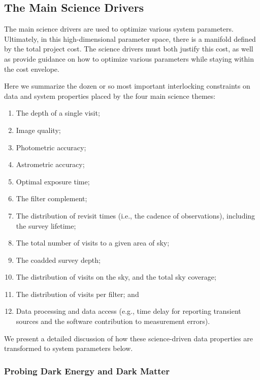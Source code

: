 \subsection{The Main Science Drivers }

The main science drivers are used to optimize various system parameters.
Ultimately, in this high-dimensional parameter space, there is a
manifold defined by the total project cost. The science
drivers must both justify this cost, as well as provide guidance
on how to optimize various parameters while staying within the cost envelope.

Here we summarize the dozen or so most important interlocking constraints on data
and system properties placed by the four main science themes:

\begin{enumerate}
\item  The depth of a single visit;
\item  Image quality;
\item  Photometric accuracy;
\item  Astrometric accuracy;
\item  Optimal exposure time;
\item  The filter complement;
\item  The distribution of revisit times (i.e., the cadence of observations),
                including the survey lifetime;
\item  The total number of visits to a given area of sky;
\item  The coadded survey depth;
\item  The distribution of visits on the sky, and the total sky coverage;
\item  The distribution of visits per filter; and
\item  Data processing and data access (e.g., time delay for reporting
         transient sources and the software contribution to measurement errors).
\end{enumerate}

We present a detailed discussion of how these science-driven data properties are
transformed to system parameters below.


\subsubsection{Probing Dark Energy and Dark Matter}
\label{sec:Dark_Energy}

